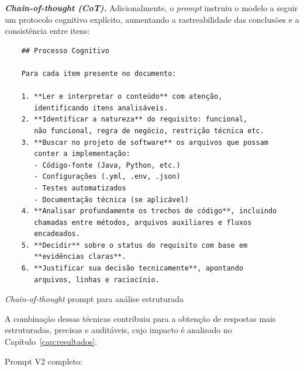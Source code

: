 \textit{\textbf{Chain-of-thought (CoT).}}
Adicionalmente, o \textit{prompt} instruiu o modelo a seguir um protocolo cognitivo explícito, aumentando a rastreabilidade das conclusões e a consistência entre itens:
\begin{algorithm}
\begin{verbatim}
    ## Processo Cognitivo
    
    Para cada item presente no documento:
    
    1. **Ler e interpretar o conteúdo** com atenção, 
       identificando itens analisáveis.
    2. **Identificar a natureza** do requisito: funcional, 
       não funcional, regra de negócio, restrição técnica etc.
    3. **Buscar no projeto de software** os arquivos que possam 
       conter a implementação:
       - Código-fonte (Java, Python, etc.)
       - Configurações (.yml, .env, .json)
       - Testes automatizados
       - Documentação técnica (se aplicável)
    4. **Analisar profundamente os trechos de código**, incluindo 
       chamadas entre métodos, arquivos auxiliares e fluxos 
       encadeados.
    5. **Decidir** sobre o status do requisito com base em 
       **evidências claras**.
    6. **Justificar sua decisão tecnicamente**, apontando 
       arquivos, linhas e raciocínio.
\end{verbatim}
\caption{\textit{Chain-of-thought} prompt para análise estruturada}
\label{alg:prompt_cot}
\end{algorithm}

A combinação dessas técnicas contribuiu para a obtenção de respostas mais estruturadas, precisas e auditáveis, cujo impacto é analisado no Capítulo~\ref{cap:resultados}.

Prompt V2 completo:

